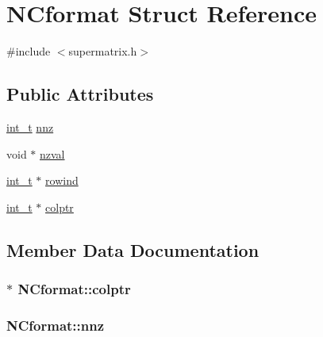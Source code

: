 \hypertarget{structNCformat}{}\section{N\+Cformat Struct Reference}
\label{structNCformat}


{\ttfamily \#include $<$supermatrix.\+h$>$}

\subsection*{Public Attributes}
\begin{DoxyCompactItemize}
\item 
\hyperlink{slu__cdefs_8h_ab6fd6105e64ed14a0c9281326f05e623}{int\+\_\+t} \hyperlink{structNCformat_affa2566dd89ea8ce6422f788887b5b27}{nnz}
\item 
void $\ast$ \hyperlink{structNCformat_aa3e85810bb190b7359d8aaa956a64e64}{nzval}
\item 
\hyperlink{slu__cdefs_8h_ab6fd6105e64ed14a0c9281326f05e623}{int\+\_\+t} $\ast$ \hyperlink{structNCformat_a16eb8492bb5694035ef3e620ea8c77b1}{rowind}
\item 
\hyperlink{slu__cdefs_8h_ab6fd6105e64ed14a0c9281326f05e623}{int\+\_\+t} $\ast$ \hyperlink{structNCformat_a881f460e39f34bbbf70909b6b0629adc}{colptr}
\end{DoxyCompactItemize}


\subsection{Member Data Documentation}
\hypertarget{structNCformat_a881f460e39f34bbbf70909b6b0629adc}{}
\subsubsection[{colptr}]{$\ast$ N\+Cformat\+::colptr}\label{structNCformat_a881f460e39f34bbbf70909b6b0629adc}
\hypertarget{structNCformat_affa2566dd89ea8ce6422f788887b5b27}{}
\subsubsection[{nnz}]{ N\+Cformat\+::nnz}\label{structNCformat_affa2566dd89ea8ce6422f788887b5b27}
\hypertarget{structNCformat_aa3e85810bb190b7359d8aaa956a64e64}{}
